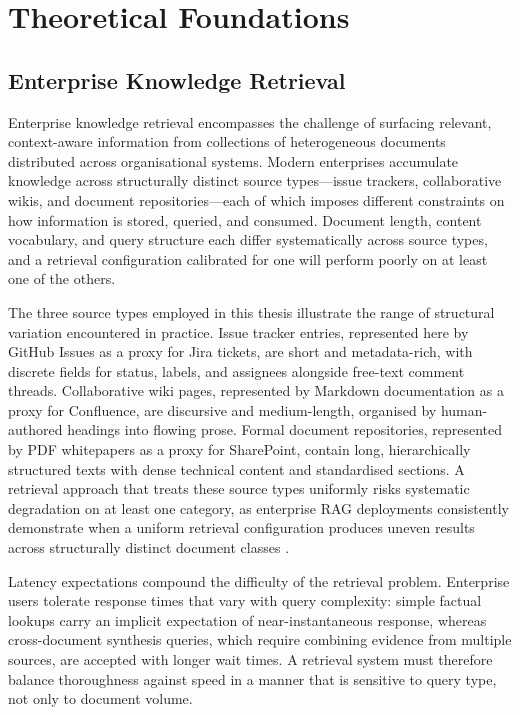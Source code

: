 
\chapter{Theoretical Foundations}
\label{ch:foundations}

\section{Enterprise Knowledge Retrieval}

Enterprise knowledge retrieval encompasses the challenge of surfacing relevant, context-aware information from collections of heterogeneous documents distributed across organisational systems. Modern enterprises accumulate knowledge across structurally distinct source types—issue trackers, collaborative wikis, and document repositories—each of which imposes different constraints on how information is stored, queried, and consumed. Document length, content vocabulary, and query structure each differ systematically across source types, and a retrieval configuration calibrated for one will perform poorly on at least one of the others.

The three source types employed in this thesis illustrate the range of structural variation encountered in practice. Issue tracker entries, represented here by GitHub Issues as a proxy for Jira tickets, are short and metadata-rich, with discrete fields for status, labels, and assignees alongside free-text comment threads. Collaborative wiki pages, represented by Markdown documentation as a proxy for Confluence, are discursive and medium-length, organised by human-authored headings into flowing prose. Formal document repositories, represented by PDF whitepapers as a proxy for SharePoint, contain long, hierarchically structured texts with dense technical content and standardised sections. A retrieval approach that treats these source types uniformly risks systematic degradation on at least one category, as enterprise RAG deployments consistently demonstrate when a uniform retrieval configuration produces uneven results across structurally distinct document classes \cite{gao2023ragsurvey}.

Latency expectations compound the difficulty of the retrieval problem. Enterprise users tolerate response times that vary with query complexity: simple factual lookups carry an implicit expectation of near-instantaneous response, whereas cross-document synthesis queries, which require combining evidence from multiple sources, are accepted with longer wait times. A retrieval system must therefore balance thoroughness against speed in a manner that is sensitive to query type, not only to document volume.

